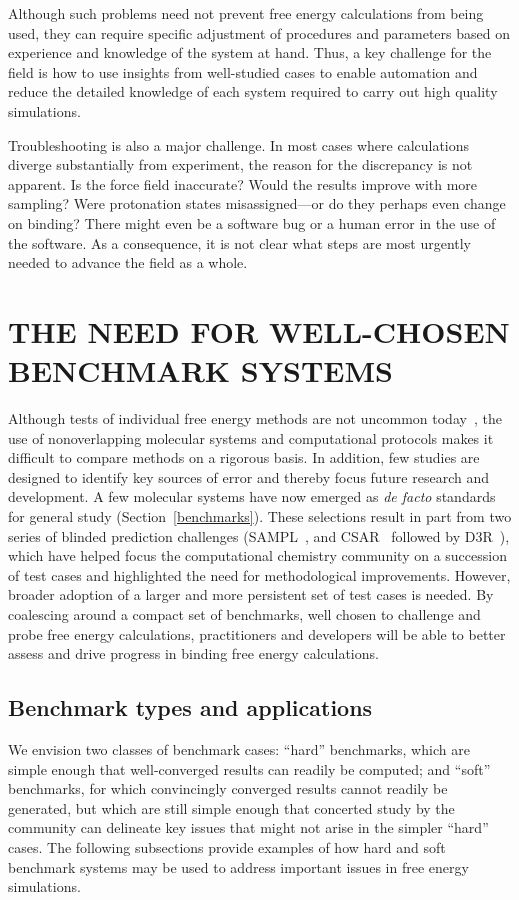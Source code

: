 \documentclass[aps,pre,twocolumn,nofootinbib,superscriptaddress,10pt, final,tightenlines]{revtex4-1}
\begin{document}
Although such problems need not prevent free energy calculations from being used, they can require specific adjustment of procedures and parameters based on experience and knowledge of the system at hand.  
Thus, a key challenge for the field is how to use insights from well-studied cases to enable automation and reduce the detailed knowledge of each system required to carry out high quality simulations. 

Troubleshooting is also a major challenge. 
In most cases where calculations diverge substantially from experiment, the reason for the discrepancy is not apparent. 
Is the force field inaccurate? 
Would the results improve with more sampling?  Were protonation states misassigned---or do they perhaps even change on binding? 
There might even be a software bug \cite{eklund_cluster_2016} or a human error in the use of the software. 
As a consequence, it is not clear what steps are most urgently needed to advance the field as a whole.


\section{THE NEED FOR WELL-CHOSEN BENCHMARK SYSTEMS}

Although tests of individual free energy methods are not uncommon today~\cite{mikulskis_large-scale_2014, schrodinger_accurate_2015, christ_binding_2016, cui_affinity_2016, verras_free_2016}, the use of nonoverlapping molecular systems and computational protocols makes it difficult to compare methods on a rigorous basis.
In addition, few studies are designed to identify key sources of error and thereby focus future research and development.
A few molecular systems have now emerged as \emph{de facto} standards for general study (Section~\ref{benchmarks}). 
These selections result in part from two series of blinded prediction challenges (SAMPL~\cite{muddana_sampl4_2014}, and CSAR~\cite{dunbar_csar_2011} followed by D3R~\cite{Gathiaka:2016:JComputAidedMolDes}), which have helped focus the computational chemistry community on a succession of test cases and highlighted the need for methodological improvements. 
However, broader adoption of a larger and more persistent set of test cases is needed. 
By coalescing around a compact set of benchmarks, well chosen to challenge and probe free energy calculations, practitioners and developers will be able to better assess and drive progress in binding free energy calculations. 


\subsection{Benchmark types and applications}
\label{subsec:benchmarktypes}
We envision two classes of benchmark cases: ``hard'' benchmarks, which are simple enough that well-converged results can readily be computed; and ``soft'' benchmarks, for which convincingly converged results cannot readily be generated, but which are still simple enough that concerted study by the community can delineate key issues that might not arise in the simpler ``hard'' cases. 
The following subsections provide examples of how hard and soft benchmark systems may be used to address important issues in free energy simulations.
\end{document}
